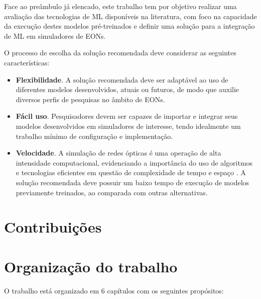 Face ao preâmbulo já elencado, este trabalho tem por objetivo realizar uma avaliação das tecnologias de ML disponíveis na literatura, com foco na capacidade da execução destes modelos pré-treinados e definir uma solução para a integração de ML em simuladores de EONs.

O processo de escolha da solução recomendada deve considerar as seguintes características:

\begin{itemize}
  \item \textbf{Flexibilidade}. A solução recomendada deve ser adaptável ao uso de diferentes modelos desenvolvidos, atuais ou futuros, de modo que auxilie diversos perfis de pesquisas no âmbito de EONs.
  \item \textbf{Fácil uso}. Pesquisadores devem ser capazes de importar e integrar seus modelos desenvolvidos em simuladores de interesse, tendo idealmente um trabalho mínimo de configuração e implementação.
  \item \textbf{Velocidade}. A simulação de redes ópticas é uma operação de alta intensidade computacional, evidenciando a importância do uso de algoritmos e tecnologias eficientes em questão de complexidade de tempo e espaço \cite{chehab_2019}. A solução recomendada deve possuir um baixo tempo de execução de modelos previamente treinados, ao comparada com outras alternativas.
\end{itemize}

\section{Contribuições}
\label{intro-contributions}



\section{Organização do trabalho}
\label{intro-org}

O trabalho está organizado em 6 capítulos com os seguintes propósitos:

